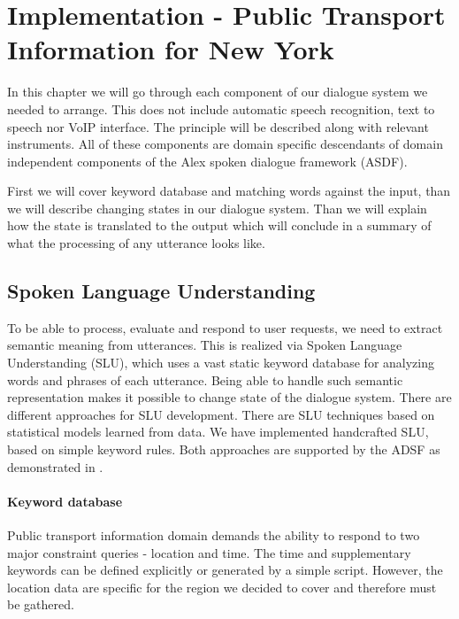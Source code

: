 \chapter{Implementation - Public Transport Information for New York}

In this chapter we will go through each component of our dialogue system we needed to arrange.
This does not include automatic speech recognition, text to speech nor VoIP interface.
The principle will be described along with relevant instruments. %
All of these components are domain specific descendants of domain independent components of the Alex spoken dialogue framework (ASDF).

First we will cover keyword database and matching words against the input, than we will describe changing states in our dialogue system.
Than we will explain how the state is translated to the output which will conclude in a summary of what the processing of any utterance looks like.

\section{Spoken Language Understanding}

To be able to process, evaluate and respond to user requests, we need to extract semantic meaning from utterances. %
This is realized via Spoken Language Understanding (SLU), which uses a vast static keyword database for analyzing words and phrases of each utterance.
Being able to handle such semantic representation makes it possible to change state of the dialogue system.
There are different approaches for SLU development.
There are SLU techniques based on statistical models learned from data.
We have implemented handcrafted SLU, based on simple keyword rules.
Both approaches are supported by the ADSF as demonstrated in \cite{slu}.


\subsubsection{Keyword database} 

Public transport information domain demands the ability to respond to two major constraint queries - location and time.
The time and supplementary keywords can be defined explicitly or generated by a simple script.
However, the location data are specific for the region we decided to cover and therefore must be gathered.

